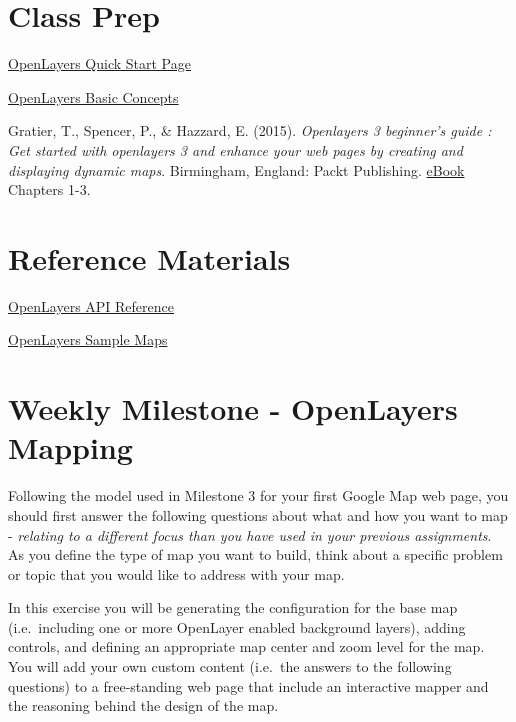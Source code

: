\documentclass[]{book}
\begin{document}
\section{Class Prep}\label{week10-prep}

\href{http://openlayers.org/en/v3.14.2/doc/quickstart.html}{OpenLayers
Quick Start Page}

\href{http://openlayers.org/en/v3.14.2/doc/tutorials/concepts.html}{OpenLayers
Basic Concepts}

Gratier, T., Spencer, P., \& Hazzard, E. (2015). \emph{Openlayers 3
beginner's guide : Get started with openlayers 3 and enhance your web
pages by creating and displaying dynamic maps}. Birmingham, England:
Packt Publishing.
\href{https://unm-on-worldcat-org.libproxy.unm.edu/oclc/903963849?databaseList=1271,143,1487,1533,1540,1672,1708,173,1925,2006,2007,203,2201,2237,2259,2260,2261,2262,2263,2264,2267,2268,2281,2328,3036,3201,638}{eBook}
Chapters 1-3.

\section{Reference Materials}\label{week10-reference}

\href{http://openlayers.org/en/v3.14.2/apidoc/}{OpenLayers API
Reference}

\href{http://openlayers.org/en/v3.2.1/examples/}{OpenLayers Sample Maps}

\section{Weekly Milestone - OpenLayers Mapping}\label{week10-milestone}

Following the model used in Milestone 3 for your first Google Map web
page, you should first answer the following questions about what and how
you want to map - \emph{relating to a different focus than you have used
in your previous assignments}. As you define the type of map you want to
build, think about a specific problem or topic that you would like to
address with your map.

In this exercise you will be generating the configuration for the base
map (i.e.~including one or more OpenLayer enabled background layers),
adding controls, and defining an appropriate map center and zoom level
for the map. You will add your own custom content (i.e.~the answers to
the following questions) to a free-standing web page that include an
interactive mapper and the reasoning behind the design of the map.
\end{document}
